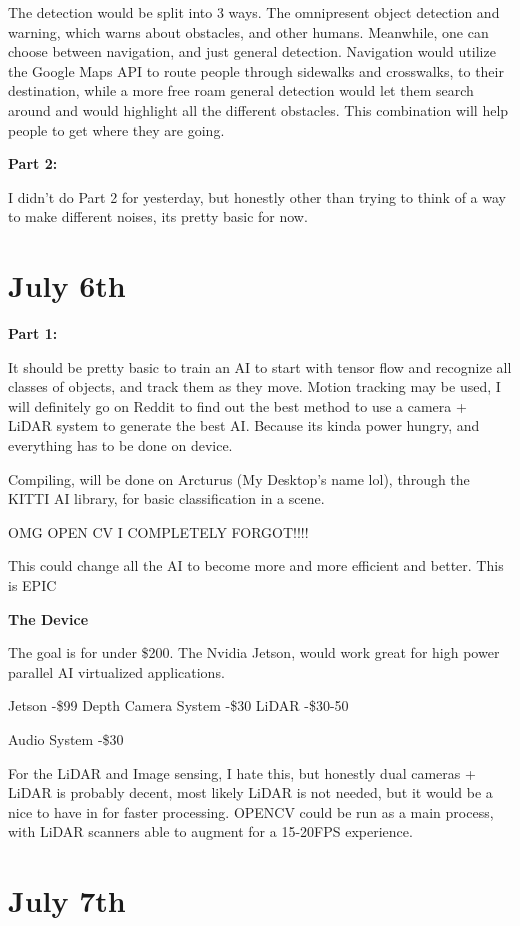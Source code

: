 \documentclass{article}
\begin{document}
The detection would be split into 3 ways. The omnipresent object detection and warning, which warns about obstacles, and other humans. Meanwhile, one can choose between navigation, and just general detection. Navigation would utilize the Google Maps API to route people through sidewalks and crosswalks, to their destination, while a more free roam general detection would let them search around and would highlight all the different obstacles. This combination will help people to get where they are going.

\textbf{Part 2:}

I didn't do Part 2 for yesterday, but honestly other than trying to think of a way to make different noises, its pretty basic for now. 



\section{July 6th}

\textbf{Part 1:}

It should be pretty basic to train an AI to start with tensor flow and recognize all classes of objects, and track them as they move. Motion tracking may be used, I will definitely go on Reddit to find out the best method to use a camera + LiDAR system to generate the best AI. Because its kinda power hungry, and everything has to be done on device.

Compiling, will be done on Arcturus (My Desktop's name lol), through the KITTI AI library, for basic classification in a scene.

OMG OPEN CV I COMPLETELY FORGOT!!!!

This could change all the AI to become more and more efficient and better. This is EPIC

\textbf{The Device}

The goal is for under \$200. The Nvidia Jetson, would work great for high power parallel AI virtualized applications. 

Jetson -\$99
Depth Camera System -\$30
LiDAR -\$30-50

Audio System -\$30


For the LiDAR and Image sensing, I hate this, but honestly dual cameras + LiDAR is probably decent, most likely LiDAR is not needed, but it would be a nice to have in for faster processing. OPENCV could be run as a main process, with LiDAR scanners able to augment for a 15-20FPS experience. 

\section{July 7th}
\end{document}
